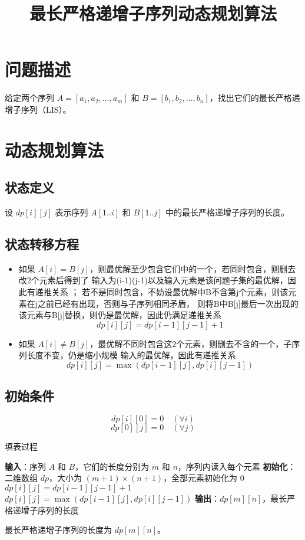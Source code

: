 \documentclass{article}
\begin{document}
\title{最长严格递增子序列动态规划算法}
\author{}
\date{}
\maketitle

\section{问题描述}
给定两个序列 $A = [a_1, a_2, \dots, a_m]$ 和 $B = [b_1, b_2, \dots, b_n]$，找出它们的最长严格递增子序列（LIS）。

\section{动态规划算法}
\subsection{状态定义}
设 $dp[i][j]$ 表示序列 $A[1..i]$ 和 $B[1..j]$ 中的最长严格递增子序列的长度。

\subsection{状态转移方程}
\begin{itemize}
    \item 如果 $A[i] = B[j]$，则最优解至少包含它们中的一个，若同时包含，则删去改2个元素后得到了
    输入为(i-1)(j-1)以及输入元素是该问题子集的最优解，因此有递推关系 ；
    若不是同时包含，不妨设最优解中B不含第j个元素，则该元素在j之前已经有出现，否则与子序列相同矛盾，
    则将B中B[j]最后一次出现的该元素与B[j]替换，则仍是最优解，因此仍满足递推关系
    \[ 
        dp[i][j] = dp[i-1][j-1] + 1 
        \]
    \item 如果 $A[i] \neq B[j]$，最优解不同时包含这2个元素，则删去不含的一个，子序列长度不变，仍是缩小规模
   输入的最优解，因此有递推关系
    \[
    dp[i][j] = \max(dp[i-1][j], dp[i][j-1]) 
    \]
\end{itemize}

\subsection{初始条件}
\[ 
dp[i][0] = 0 \quad (\forall i) 
\]
\[ 
dp[0][j] = 0 \quad (\forall j) 
\]
\begin{algorithm}
    \caption{填表过程}
\begin{algorithmic}[1]
    \State \textbf{输入}：序列 $A$ 和 $B$，它们的长度分别为 $m$ 和 $n$，序列内读入每个元素
    \State \textbf{初始化}：二维数组 $dp$，大小为 $(m+1) \times (n+1)$，全部元素初始化为 0
                \State $dp[i][j] = dp[i-1][j-1] + 1$
            \Else
                \State $dp[i][j] = \max(dp[i-1][j], dp[i][j-1])$
            \EndIf
        \EndFor
    \EndFor
    \State \textbf{输出}：$dp[m][n]$，最长严格递增子序列的长度
    \end{algorithmic}
    \end{algorithm}
最长严格递增子序列的长度为 $dp[m][n]$。
\end{document}
